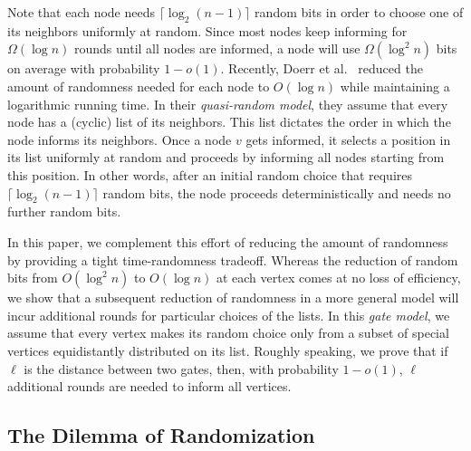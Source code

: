 \documentclass{article}
\begin{document}
Note that each node needs $\lceil\log_2 (n-1)\rceil$ random bits in order to choose one of its neighbors uniformly at random. Since most nodes keep informing for $\Omega(\log n)$ rounds until all nodes are informed, a node will use $\Omega(\log^{2} n)$ bits on average with probability $1-o(1)$. Recently, Doerr et al.~\cite{BC} reduced the amount of randomness needed for each node to $O(\log n)$ while maintaining a logarithmic running time. In their \textit{quasi-random model}, they assume that every node has a (cyclic) list of its neighbors. This list dictates the order in which the node informs its neighbors. Once a node $v$ gets informed, it selects a position in its list uniformly at random and proceeds by informing all nodes starting from this position. In other words, after an initial random choice that requires $\lceil\log_2 (n-1)\rceil$ random bits, the node proceeds deterministically and needs no further random bits. 

In this paper, we complement this effort of reducing the amount of randomness by providing a tight time-randomness tradeoff. Whereas the reduction of random bits from $O(\log^2 n)$ to $O(\log n)$ at each vertex comes at no loss of efficiency, we show that a subsequent reduction of randomness in a more general model will incur additional rounds for particular choices of the lists. In this \textit{gate model}, we assume that every vertex makes its random choice only from a subset of special vertices equidistantly distributed on its list. Roughly speaking, we prove that if $\ell$ is the distance between two gates, then, with probability $1-o(1)$, $\ell$ additional rounds are needed to inform all vertices. 

\subsection{The Dilemma of Randomization}
\end{document}

